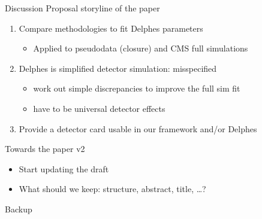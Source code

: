 \documentclass[aspectratio=169]{beamer}
\begin{document}
\begin{frame}{Discussion}
  Proposal storyline of the paper
  \begin{enumerate}
    \item Compare methodologies to fit Delphes parameters
    \begin{itemize}
        \item Applied to pseudodata (closure) and CMS full simulations
    \end{itemize}
    \item Delphes is simplified detector simulation: misspecified
    \begin{itemize}
        \item work out simple discrepancies to improve the full sim fit
        \item have to be universal detector effects
    \end{itemize}
    \item Provide a detector card usable in our framework and/or Delphes
  \end{enumerate}

  \vspace{0.5cm}
  Towards the paper v2
  \begin{itemize}
      \item Start updating the draft
      \item What should we keep: structure, abstract, title, \ldots?
  \end{itemize}
\end{frame}

\begin{frame}{Backup}
\end{frame}
\end{document}

